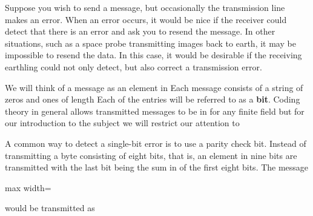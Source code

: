 \documentclass[11pt,oneside]{article}
\begin{document}
\fi
\renewcommand{\BookFooter}{Section 29 Algebraic Coding Theory}
\ifdefined\BookMaster\else\setcounter{page}{237}\fi
\BookNarrativetrue

\begin{BookBody}


\noindent Suppose you wish to send a message, but occasionally the transmission line makes an error. When an error occurs, it would be nice if the receiver could detect that there is an error and ask you to resend the message. In other situations, such as a space probe transmitting images back to earth, it may be impossible to resend the data. In this case, it would be desirable if the receiving earthling could not only detect, but also correct a transmission error.

We will think of a message as an element in  Each message consists of a string of zeros and ones of length  Each of the  entries will be referred to as a\textbf{ bit}. Coding theory in general allows transmitted messages to be in  for any finite field  but for our introduction to the subject we will restrict our attention to 

 A common way to detect a single-bit error is to use a parity check bit. Instead of transmitting a byte consisting of eight bits, that is, an element in  nine bits are transmitted with the last bit being the sum in  of the first eight bits. The message

\begin{center}\begin{adjustbox}{max width=\linewidth}\end{adjustbox}\end{center}

\noindent would be transmitted as


\end{BookBody}
\end{document}
